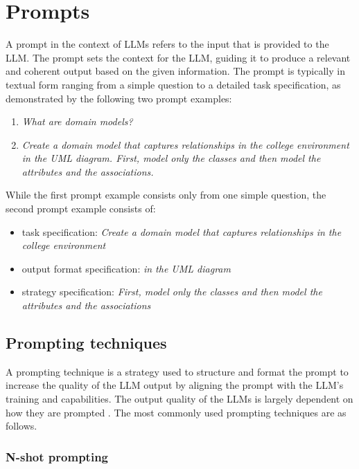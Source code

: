 \section{Prompts}

A prompt in the context of LLMs refers to the input that is provided to the LLM. The prompt sets the context for the LLM, guiding it to produce a relevant and coherent output based on the given information. The prompt is typically in textual form ranging from a simple question to a detailed task specification, as demonstrated by the following two prompt examples:

\begin{enumerate}
\item \textit{What are domain models?}
\item \textit{Create a domain model that captures relationships in the college environment in the UML diagram. First, model only the classes and then model the attributes and the associations.} \\
\end{enumerate}

\noindent{}While the first prompt example consists only from one simple question, the second prompt example consists of:
\begin{itemize}
\item task specification: \textit{Create a domain model that captures relationships in the college environment}
\item output format specification: \textit{in the UML diagram}
\item strategy specification: \textit{First, model only the classes and then model the attributes and the associations}
\end{itemize}


\subsection{Prompting techniques}

A prompting technique is a strategy used to structure and format the prompt to increase the quality of the LLM output by aligning the prompt with the LLM's training and capabilities. The output quality of the LLMs is largely dependent on how they are prompted \cite{Brown2020,Wei2022}. The most commonly used prompting techniques are as follows.


\subsubsection{N-shot prompting}


